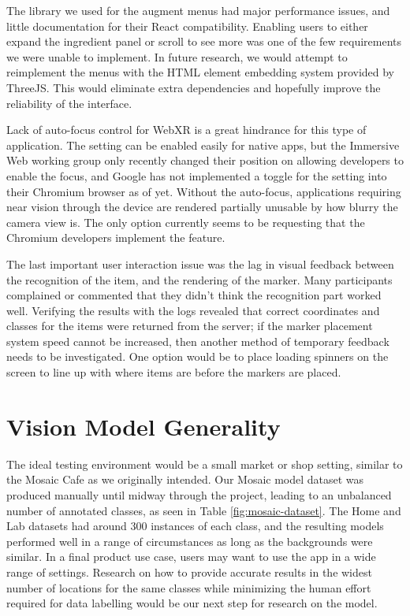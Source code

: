 \documentclass[thesis]{fputhesis}
\begin{document}
\begin{body}
The library we used for the augment menus had major performance issues, and little documentation for their React compatibility. Enabling users to either expand the ingredient panel or scroll to see more was one of the few requirements we were unable to implement. In future research, we would attempt to reimplement the menus with the HTML element embedding system provided by ThreeJS. This would eliminate extra dependencies and hopefully improve the reliability of the interface.

Lack of auto-focus control for WebXR is a great hindrance for this type of application. The setting can be enabled easily for native apps, but the Immersive Web working group only recently changed their position on allowing developers to enable the focus, and Google has not implemented a toggle for the setting into their Chromium browser as of yet. Without the auto-focus, applications requiring near vision through the device are rendered partially unusable by how blurry the camera view is. The only option currently seems to be requesting that the Chromium developers implement the feature.

The last important user interaction issue was the lag in visual feedback between the recognition of the item, and the rendering of the marker. Many participants complained or commented that they didn't think the recognition part worked well. Verifying the results with the logs revealed that correct coordinates and classes for the items were returned from the server; if the marker placement system speed cannot be increased, then another method of temporary feedback needs to be investigated. One option would be to place loading spinners on the screen to line up with where items are before the markers are placed.

\section{Vision Model Generality}
The ideal testing environment would be a small market or shop setting, similar to the Mosaic Cafe as we originally intended. Our Mosaic model dataset was produced manually until midway through the project, leading to an unbalanced number of annotated classes, as seen in Table \ref{fig:mosaic-dataset}. The Home and Lab datasets had around 300 instances of each class, and the resulting models performed well in a range of circumstances as long as the backgrounds were similar. In a final product use case, users may want to use the app in a wide range of settings. Research on how to provide accurate results in the widest number of locations for the same classes while minimizing the human effort required for data labelling would be our next step for research on the model.


\end{body}
\end{document}
